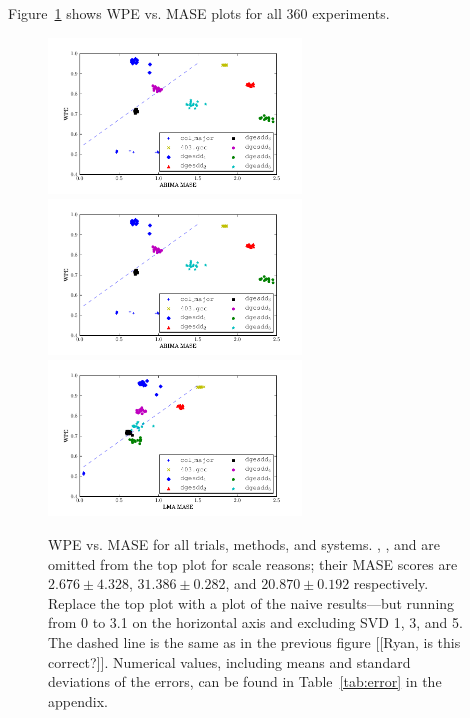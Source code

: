 Figure~\ref{fig:wpe_vs_mase_all} shows WPE vs. MASE plots for all 360
experiments.
\begin{figure}
  \centering
    \includegraphics[width=0.6\textwidth]{figs/ARIMA_prediction_vs_entropy}
    \includegraphics[width=0.6\textwidth]{figs/ARIMA_prediction_vs_entropy}
    \includegraphics[width=0.6\textwidth]{figs/LMA_prediction_vs_entropy}
\caption{WPE vs. MASE for all trials, methods, and systems.  \svdone,
  \svdthree, and \svdfive are omitted from the top plot for scale
  reasons; their MASE scores are $2.676 \pm 4.328$, $31.386 \pm
  0.282$, and $20.870 \pm 0.192$ respectively.  {\color{red}Replace
    the top plot with a plot of the naive results---but running from 0
    to 3.1 on the horizontal axis and excluding SVD 1, 3, and 5}.  The
  dashed line is the same as in the previous figure [[Ryan, is this
      correct?]].  Numerical values, including means and standard
  deviations of the errors, can be found in Table~\ref{tab:error} in
  the appendix.
% 
% 
}
    \label{fig:wpe_vs_mase_all}
\end{figure} 
